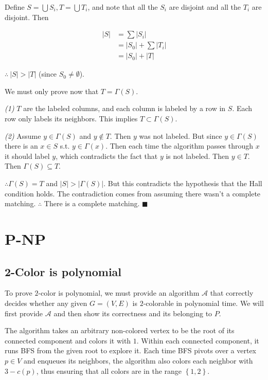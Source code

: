 Define $S = \bigcup S_i, T = \bigcup T_i$, and note that all the $S_i$ are
disjoint and all the $T_i$ are disjoint. Then

\begin{align*}
    |S| &= \sum |S_i| \\ 
        &= |S_0| + \sum |T_i| \\ 
        &= |S_0| + |T|
\end{align*}

$\therefore ~ |S| > |T|$ (since $S_0 \neq \emptyset$).

We must only prove now that $T = \Gamma(S)$. 

\textit{(1)} $T$ are the labeled columns, and each column is labeled by a row in $S$.
Each row only labels its neighbors. This implies $T \subset \Gamma(S)$.

\textit{(2)} Assume $y \in \Gamma(S)$ and $y \not\in T$. Then $y$ was 
not labeled. But since $y \in \Gamma(S)$ there is an 
$x \in S$ s.t. $y \in \Gamma(x)$. Then each time 
the algorithm passes through $x$ it should label 
$y$, which contradicts the fact that $y$ is not 
labeled. Then $y \in T$. Then $\Gamma(S) \subseteq T$.

$\therefore \Gamma(S) = T$ and $|S| > |\Gamma(S)|$. But this contradicts 
the hypothesis that the Hall condition holds. The 
contradiction comes from assuming there wasn't a 
complete matching. $\therefore $ There is a complete
matching. $\blacksquare$

\pagebreak
\section{P-NP}

\subsection{2-Color is polynomial}

To prove $2$-color is polynomial, we must provide an algorithm $\mathcal{A}$
that correctly decides whether any given $G = (V, E)$ is $2$-colorable in
polynomial time. We will first provide $\mathcal{A}$ and then show its
correctness and its belonging to $P$.

The algorithm takes an arbitrary non-colored vertex to be the root of its
connected component and colors it with $1$. Within each connected component, it
runs BFS from the given root to explore it. Each time BFS
pivots over a vertex $p \in V$ and enqueues its neighbors, the algorithm also
colors each neighbor with $3 - c(p)$, thus ensuring that all colors are in the
range $\left\{ 1, 2 \right\} $.

